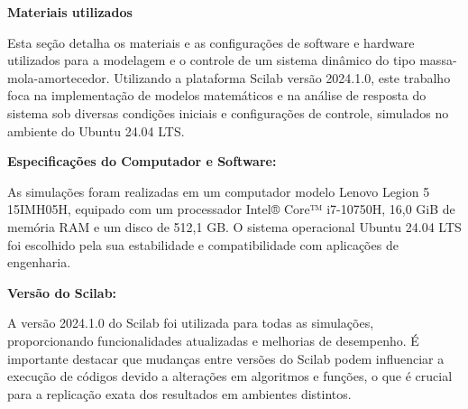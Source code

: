 \begin{titlepage}
    \thispagestyle{empty} %

    \noindent\textbf{\Large Materiais utilizados}

    \vspace{1cm} %

    Esta seção detalha os materiais e as configurações de software e hardware utilizados para a modelagem e o controle de um sistema dinâmico do tipo massa-mola-amortecedor. Utilizando a plataforma Scilab versão 2024.1.0, este trabalho foca na implementação de modelos matemáticos e na análise de resposta do sistema sob diversas condições iniciais e configurações de controle, simulados no ambiente do Ubuntu 24.04 LTS.

    \vspace{0.3cm} %

    \textbf{Especificações do Computador e Software:}

    As simulações foram realizadas em um computador modelo Lenovo Legion 5 15IMH05H, equipado com um processador Intel® Core™ i7-10750H, 16,0 GiB de memória RAM e um disco de 512,1 GB. O sistema operacional Ubuntu 24.04 LTS foi escolhido pela sua estabilidade e compatibilidade com aplicações de engenharia.

    \vspace{0.3cm} %

    \textbf{Versão do Scilab:}

    A versão 2024.1.0 do Scilab foi utilizada para todas as simulações, proporcionando funcionalidades atualizadas e melhorias de desempenho. É importante destacar que mudanças entre versões do Scilab podem influenciar a execução de códigos devido a alterações em algoritmos e funções, o que é crucial para a replicação exata dos resultados em ambientes distintos.

\end{titlepage}
